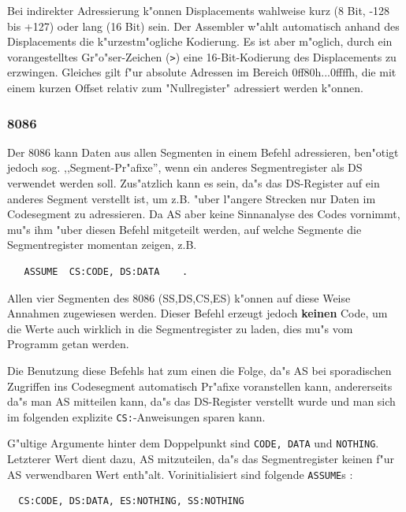 \documentclass[12pt,a4paper,twoside]{report}
\newcommand{\bb}[1]{{\bf #1}}
\newcommand{\tty}[1]{{\tt #1}}
\newcommand{\asname}{AS}
\begin{document}
Bei indirekter Adressierung k"onnen Displacements wahlweise kurz (8 Bit,
-128 bis +127) oder lang (16 Bit) sein.  Der Assembler w"ahlt automatisch
anhand des Displacements die k"urzestm"ogliche Kodierung.  Es ist aber m"oglich,
durch ein vorangestelltes Gr"o"ser-Zeichen (\verb!>!) eine 16-Bit-Kodierung
des Displacements zu erzwingen.  Gleiches gilt f"ur absolute Adressen im
Bereich 0ff80h...0ffffh, die mit einem kurzen Offset relativ zum "Nullregister"
adressiert werden k"onnen.


\subsubsection{8086}

Der 8086 kann Daten aus allen Segmenten in einem Befehl adressieren,
ben"otigt jedoch sog. ,,Segment-Pr"afixe'', wenn ein anderes Segmentregister
als DS verwendet werden soll.  Zus"atzlich kann es sein, da"s das
DS-Register auf ein anderes Segment verstellt ist, um z.B. "uber l"angere
Strecken nur Daten im Codesegment zu adressieren.  Da \asname{} aber keine
Sinnanalyse des Codes vornimmt, mu"s ihm "uber diesen Befehl mitgeteilt
werden, auf welche Segmente die Segmentregister momentan zeigen, z.B.
\begin{verbatim}
   ASSUME  CS:CODE, DS:DATA    .
\end{verbatim}
Allen vier Segmenten des 8086 (SS,DS,CS,ES) k"onnen auf diese Weise Annahmen
zugewiesen werden.  Dieser Befehl erzeugt jedoch \bb{keinen} Code, um
die Werte auch wirklich in die Segmentregister zu laden, dies mu"s vom
Programm getan werden.
\par
Die Benutzung diese Befehls hat zum einen die Folge, da"s \asname{} bei
sporadischen Zugriffen ins Codesegment automatisch Pr"afixe voranstellen
kann, andererseits da"s man \asname{} mitteilen kann, da"s das DS-Register verstellt
wurde und man sich im folgenden explizite \tty{CS:}-Anweisungen sparen
kann.
\par
G"ultige Argumente hinter dem Doppelpunkt sind \tty{CODE, DATA} und
\tty{NOTHING}.  Letzterer Wert dient dazu, \asname{} mitzuteilen, da"s das
Segmentregister keinen f"ur \asname{} verwendbaren Wert enth"alt.
Vorinitialisiert sind folgende \tty{ASSUME}s :
\begin{verbatim}
  CS:CODE, DS:DATA, ES:NOTHING, SS:NOTHING
\end{verbatim}
\end{document}
